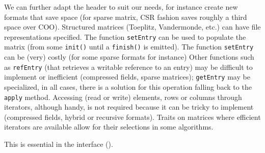 		We can further adapt the header to suit our needs, for instance 
		create new formats that save space (for sparse matrix, CSR fashion saves
		roughly a third space over COO). Structured
		matrices 
(Toeplitz, Vandermonde, etc.)
can have file representations specified.
%
		The function \texttt{setEntry} can be
		used to populate the matrix (from some \texttt{init()} until a
		\texttt{finish()} is emitted).  The function \texttt{setEntry}
		can be (very) costly (for some sparse formats for instance)
%
		Other functions such as {\tt refEntry} (that retrieves a
		writable reference to an entry) may be difficult to implement
		or inefficient (compressed fields, sparse matrices);
		\texttt{getEntry} may be specialized, in all cases, there is a
		solution for this operation falling back to the {\tt apply}
		method.
		Accessing (read or write) elements, rows or columns through
		iterators, although handy, is not required because it can be
		tricky to implement (compressed fields, hybrid or
		recursive formats). Traits on matrices where efficient iterators
		are available allow for their selections in some algorithms.
		\begin{comment}
		(\danger We cannot have {\tt const} iterators for all formats
		(see hybrid), walking through a matrix in unspecified order can
		be problematic, for instance, in an hom when a zero may
		alter/change the representation. I don't understand hom more
		than I understand init/rebind by the way, and I won't
		understand it until the morphism is given/chooseable/enforced.
		Rebind is really hom, so why is it in the interface anyway?
		This is the same with getEntry. We don't require it because we
		have a solution. Also, if apply is to be implemented via a
		domain or {\tt mul}, we could stress it is in the interface for
		convenience when writing code only. End of \danger)
		\end{comment}
%
		This is essential in the \applin interface ().
